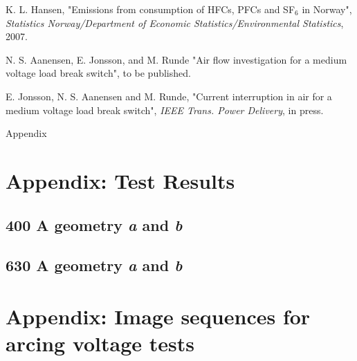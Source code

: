 \documentclass[10pt,b5paper,twoside]{article}
\begin{document}
\begin{thebibliography}{10}
 K. L. Hansen, "Emissions from consumption of HFCs, PFCs and SF$_6$ in Norway", \textit{Statistics Norway/Department of Economic Statistics/Environmental Statistics}, 2007.

 N. S. Aanensen, E. Jonsson, and M. Runde "Air flow investigation for a medium voltage load break switch", to be published.

 E. Jonsson, N. S. Aanensen and M. Runde, "Current interruption in air for a medium voltage load break switch", \textit{IEEE Trans. Power Delivery}, in press.

\end{thebibliography}

\cleardoublepage
\appendix
\vspace*{\fill}
\begingroup
\begin{center}
\huge Appendix
\end{center}
\endgroup
\vspace*{\fill}
\cleardoublepage
\section{Appendix: Test Results} \label{app:rawData}
\setcounter{figure}{0}
\makeatletter 
\renewcommand{\thefigure}{A.\@arabic\c@figure}
\makeatother

\setcounter{table}{0}
\makeatletter 
\renewcommand{\thetable}{A.\@arabic\c@table}
\makeatother

\subsection{400 A geometry \textit{a} and \textit{b}} \label{app:testResults400A} 

\subsection{630 A geometry \textit{a} and \textit{b}} \label{app:testResults630A}

\newpage



\cleardoublepage
\section{Appendix: Image sequences for arcing voltage tests} \label{app:ImageSequences}
\makeatletter 
\renewcommand{\thefigure}{B.\@arabic\c@figure}
\makeatother

\makeatletter 
\renewcommand{\thetable}{B.\@arabic\c@table}
\makeatother
\end{document}
